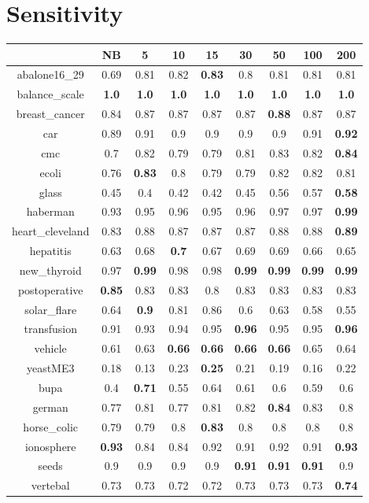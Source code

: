 \documentclass{article}%
\begin{document}
%
\section*{Sensitivity}%
\begin{tabular}{c|cccccccc}%
\hline%
&NB&5&10&15&30&50&100&200\\%
\hline%
abalone16\_29&0.69&0.81&0.82&\textbf{0.83}&0.8&0.81&0.81&0.81\\%
\hline%
balance\_scale&\textbf{1.0}&\textbf{1.0}&\textbf{1.0}&\textbf{1.0}&\textbf{1.0}&\textbf{1.0}&\textbf{1.0}&\textbf{1.0}\\%
\hline%
breast\_cancer&0.84&0.87&0.87&0.87&0.87&\textbf{0.88}&0.87&0.87\\%
\hline%
car&0.89&0.91&0.9&0.9&0.9&0.9&0.91&\textbf{0.92}\\%
\hline%
cmc&0.7&0.82&0.79&0.79&0.81&0.83&0.82&\textbf{0.84}\\%
\hline%
ecoli&0.76&\textbf{0.83}&0.8&0.79&0.79&0.82&0.82&0.81\\%
\hline%
glass&0.45&0.4&0.42&0.42&0.45&0.56&0.57&\textbf{0.58}\\%
\hline%
haberman&0.93&0.95&0.96&0.95&0.96&0.97&0.97&\textbf{0.99}\\%
\hline%
heart\_cleveland&0.83&0.88&0.87&0.87&0.87&0.88&0.88&\textbf{0.89}\\%
\hline%
hepatitis&0.63&0.68&\textbf{0.7}&0.67&0.69&0.69&0.66&0.65\\%
\hline%
new\_thyroid&0.97&\textbf{0.99}&0.98&0.98&\textbf{0.99}&\textbf{0.99}&\textbf{0.99}&\textbf{0.99}\\%
\hline%
postoperative&\textbf{0.85}&0.83&0.83&0.8&0.83&0.83&0.83&0.83\\%
\hline%
solar\_flare&0.64&\textbf{0.9}&0.81&0.86&0.6&0.63&0.58&0.55\\%
\hline%
transfusion&0.91&0.93&0.94&0.95&\textbf{0.96}&0.95&0.95&\textbf{0.96}\\%
\hline%
vehicle&0.61&0.63&\textbf{0.66}&\textbf{0.66}&\textbf{0.66}&\textbf{0.66}&0.65&0.64\\%
\hline%
yeastME3&0.18&0.13&0.23&\textbf{0.25}&0.21&0.19&0.16&0.22\\%
\hline%
bupa&0.4&\textbf{0.71}&0.55&0.64&0.61&0.6&0.59&0.6\\%
\hline%
german&0.77&0.81&0.77&0.81&0.82&\textbf{0.84}&0.83&0.8\\%
\hline%
horse\_colic&0.79&0.79&0.8&\textbf{0.83}&0.8&0.8&0.8&0.8\\%
\hline%
ionosphere&\textbf{0.93}&0.84&0.84&0.92&0.91&0.92&0.91&\textbf{0.93}\\%
\hline%
seeds&0.9&0.9&0.9&0.9&\textbf{0.91}&\textbf{0.91}&\textbf{0.91}&0.9\\%
\hline%
vertebal&0.73&0.73&0.72&0.72&0.73&0.73&0.73&\textbf{0.74}\\%
\hline%
\end{tabular}
\end{document}
